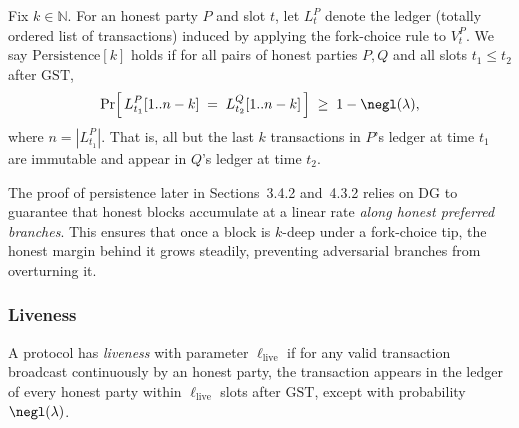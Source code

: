 \begin{definition}
Fix $k \in \mathbb{N}$. For an honest party $P$ and slot $t$, let $L_t^P$ denote
the ledger (totally ordered list of transactions) induced by applying the fork-choice
rule to $V_t^P$. We say $\mathrm{Persistence}[k]$ holds if for all pairs of honest
parties $P,Q$ and all slots $t_1 \le t_2$ after $\mathrm{GST}$,
\[
\Pr\!\Big[\, L_{t_1}^P[1..n-k] \;=\; L_{t_2}^Q[1..n-k] \,\Big] \;\ge\; 1-\negl(\lambda),
\]
where $n=|L_{t_1}^P|$. That is, all but the last $k$ transactions in $P$'s ledger
at time $t_1$ are immutable and appear in $Q$'s ledger at time $t_2$.
\end{definition}

\begin{remark}
The proof of persistence later in Sections~3.4.2 and~4.3.2 relies on DG 
to guarantee that honest blocks accumulate at a linear rate \emph{along honest preferred branches}. 
This ensures that once a block is $k$-deep under a fork-choice tip, the honest margin behind it 
grows steadily, preventing adversarial branches from overturning it. 
\end{remark}




\subsubsection{Liveness}



A protocol has \emph{liveness} with parameter $\ell_{\mathrm{live}}$ if for any valid transaction broadcast continuously by an honest party,
the transaction appears in the ledger of every honest party within $\ell_{\mathrm{live}}$ slots after $\mathrm{GST}$,
except with probability $\negl(\lambda)$.



